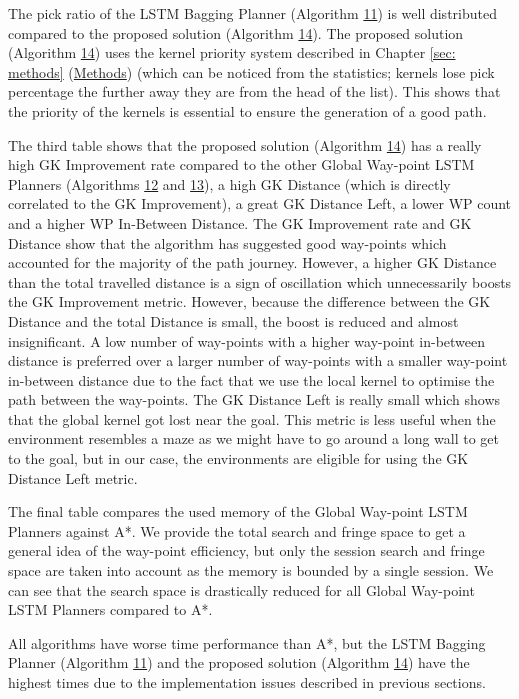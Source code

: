 The pick ratio of the LSTM Bagging Planner (Algorithm \hyperref[tab: evalalgorithms]{11}) is well distributed compared to the proposed solution (Algorithm \hyperref[tab: evalalgorithms]{14}). The proposed solution (Algorithm \hyperref[tab: evalalgorithms]{14}) uses the kernel priority system described in Chapter \ref{sec: methods} (\hyperref[sec: methods]{Methods}) (which can be noticed from the statistics; kernels lose pick percentage the further away they are from the head of the list). This shows that the priority of the kernels is essential to ensure the generation of a good path.

The third table shows that the proposed solution (Algorithm \hyperref[tab: evalalgorithms]{14}) has a really high GK Improvement rate compared to the other Global Way-point LSTM Planners (Algorithms \hyperref[tab: evalalgorithms]{12} and \hyperref[tab: evalalgorithms]{13}), a high GK Distance (which is directly correlated to the GK Improvement), a great GK Distance Left, a lower WP count and a higher WP In-Between Distance. The GK Improvement rate and GK Distance show that the algorithm has suggested good way-points which accounted for the majority of the path journey. However, a higher GK Distance than the total travelled distance is a sign of oscillation which unnecessarily boosts the GK Improvement metric. However, because the difference between the GK Distance and the total Distance is small, the boost is reduced and almost insignificant. A low number of way-points with a higher way-point in-between distance is preferred over a larger number of way-points with a smaller way-point in-between distance due to the fact that we use the local kernel to optimise the path between the way-points. The GK Distance Left is really small which shows that the global kernel got lost near the goal. This metric is less useful when the environment resembles a maze as we might have to go around a long wall to get to the goal, but in our case, the environments are eligible for using the GK Distance Left metric.

The final table compares the used memory of the Global Way-point LSTM Planners against A*. We provide the total search and fringe space to get a general idea of the way-point efficiency, but only the session search and fringe space are taken into account as the memory is bounded by a single session. We can see that the search space is drastically reduced for all Global Way-point LSTM Planners compared to A*.

All algorithms have worse time performance than A*, but the LSTM Bagging Planner (Algorithm \hyperref[tab: evalalgorithms]{11}) and the proposed solution (Algorithm \hyperref[tab: evalalgorithms]{14}) have the highest times due to the implementation issues described in previous sections.

